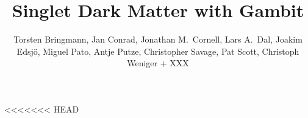 <<<<<<< HEAD
%
%
%
%
%
%
\RequirePackage{fix-cm}
%
\documentclass[twocolumn,epjc3]{svjour3}  
%
\smartqed  %
%
\RequirePackage{graphicx}
%
%
\RequirePackage{latexsym}
%
%
%


\title{Singlet Dark Matter with Gambit}



\author{Torsten Bringmann, Jan Conrad, Jonathan M.~Cornell, Lars A.~Dal, Joakim Edsj\"o, Miguel Pato, Antje Putze, Christopher Savage, Pat Scott, Christoph Weniger + XXX
}



